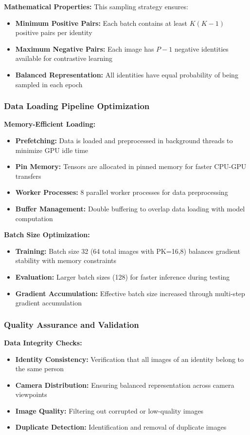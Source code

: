 \documentclass[a4paper,12pt]{article}
\begin{document}
\textbf{Mathematical Properties:}
This sampling strategy ensures:
\begin{itemize}
    \item \textbf{Minimum Positive Pairs:} Each batch contains at least $K(K-1)$ positive pairs per identity
    \item \textbf{Maximum Negative Pairs:} Each image has $P-1$ negative identities available for contrastive learning
    \item \textbf{Balanced Representation:} All identities have equal probability of being sampled in each epoch
\end{itemize}

\subsubsection{Data Loading Pipeline Optimization}

\textbf{Memory-Efficient Loading:}
\begin{itemize}
    \item \textbf{Prefetching:} Data is loaded and preprocessed in background threads to minimize GPU idle time
    \item \textbf{Pin Memory:} Tensors are allocated in pinned memory for faster CPU-GPU transfers
    \item \textbf{Worker Processes:} 8 parallel worker processes for data preprocessing
    \item \textbf{Buffer Management:} Double buffering to overlap data loading with model computation
\end{itemize}

\textbf{Batch Size Optimization:}
\begin{itemize}
    \item \textbf{Training:} Batch size 32 (64 total images with PK=16,8) balances gradient stability with memory constraints
    \item \textbf{Evaluation:} Larger batch sizes (128) for faster inference during testing
    \item \textbf{Gradient Accumulation:} Effective batch size increased through multi-step gradient accumulation
\end{itemize}

\subsubsection{Quality Assurance and Validation}

\textbf{Data Integrity Checks:}
\begin{itemize}
    \item \textbf{Identity Consistency:} Verification that all images of an identity belong to the same person
    \item \textbf{Camera Distribution:} Ensuring balanced representation across camera viewpoints
    \item \textbf{Image Quality:} Filtering out corrupted or low-quality images
    \item \textbf{Duplicate Detection:} Identification and removal of duplicate images
\end{itemize}
\end{document}
